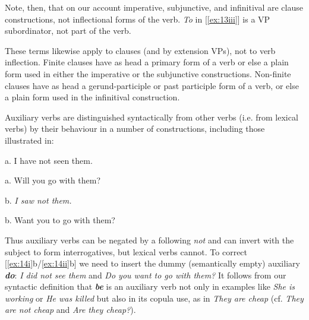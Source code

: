 \noindent Note, then, that on our account imperative, subjunctive, and infinitival are clause constructions, not inflectional forms of the verb. \textit{To} in [\ref{ex:13iii}] is a VP subordinator, not part of the verb.

These terms likewise apply to clauses (and by extension VPs), not to verb inflection. Finite clauses have as head a primary form of a verb or else a plain form used in either the imperative or the subjunctive constructions. Non-finite clauses have as head a gerund-participle or past participle form of a verb, or else a plain form used in the infinitival construction.

Auxiliary verbs are distinguished syntactically from other verbs (i.e. from lexical verbs) by their behaviour in a number of constructions, including those illustrated in:
\begin{examples}
\item \label{ex:14}
\noindent\begin{minipage}[t]{0.5\linewidth}
\par\vspace{\smallskipamount}
    \begin{examples}
        \item \label{ex:14i}
            \textnormal{a.} I have not seen them.
        \item \label{ex:14ii}
            \textnormal{a.} Will you go with them?
    \end{examples}
\end{minipage}\vspace{-\medskipamount}%
\begin{minipage}[t]{0.5\linewidth}
{\par\vspace{\smallskipamount}}
    b. \ungram \itshape I saw not them.
    
    \textnormal{b.} \ungram Want you to go with them?
\end{minipage}
\end{examples}

\noindent Thus auxiliary verbs can be negated by a following \textit{not} and can invert with the subject to form interrogatives, but lexical verbs cannot. To correct [\ref{ex:14i}b/\ref{ex:14ii}b] we need to insert the dummy (semantically empty) auxiliary \textit{\textbf{do}}: \textit{I did not see them} and \textit{Do you want to go with them?} It follows from our syntactic definition that \textit{\textbf{be}} is an auxiliary verb not only in examples like \textit{She is working} or \textit{He was killed} but also in its copula use, as in \textit{They are cheap} (cf. \textit{They are not cheap} and \textit{Are they cheap?}).

